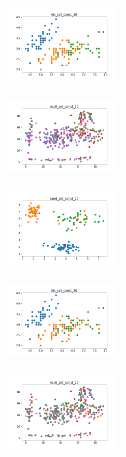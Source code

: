\newpage

\begin{figure}[H]    
    \centering
    \begin{subfigure}
        \centering
        \includegraphics[width=0.32\textwidth]{img/bl/iris_set_const_20_949004259_clust.png}
    \end{subfigure}
    \hfill
    \begin{subfigure}
        \centering
        \includegraphics[width=0.32\textwidth]{img/bl/ecoli_set_const_20_949004259_clust.png}
    \end{subfigure}
    \hfill
    \begin{subfigure}
        \centering
        \includegraphics[width=0.32\textwidth]{img/bl/rand_set_const_20_949004259_clust.png}
    \end{subfigure}
    \hfill
    \begin{subfigure}
        \centering
        \includegraphics[width=0.32\textwidth]{img/bl/iris_set_const_20_589741062_clust.png}
    \end{subfigure}
    \hfill
    \begin{subfigure}
        \centering
        \includegraphics[width=0.32\textwidth]{img/bl/ecoli_set_const_20_589741062_clust.png}

\end{subfigure}
\end{figure}

